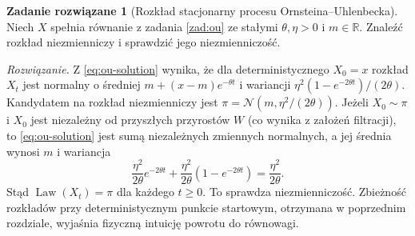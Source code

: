 \documentclass[11pt,a4paper,oneside]{report}
\numberwithin{equation}{chapter}
\theoremstyle{plain}
\theoremstyle{definition}
\newtheorem{zadanie}{Zadanie rozwiązane}[chapter]
\theoremstyle{remark}
\newcommand{\R}{\mathbb{R}}
\newcommand{\Law}{\operatorname{Law}}
\newcommand{\Normal}{\mathcal{N}}
\begin{document}
\begin{zadanie}[Rozkład stacjonarny procesu Ornsteina--Uhlenbecka]
Niech $X$ spełnia równanie z zadania \ref{zad:ou}
ze stałymi $\theta,\eta>0$ i $m\in\R$.
Znaleźć rozkład niezmienniczy i sprawdzić jego
niezmienniczość.

\emph{Rozwiązanie.} Z \eqref{eq:ou-solution}
wynika, że dla deterministycznego $X_0=x$ rozkład
$X_t$ jest normalny o średniej
$m+(x-m)e^{-\theta t}$ i wariancji
$\eta^2(1-e^{-2\theta t})/(2\theta)$.
Kandydatem na rozkład niezmienniczy jest
$\pi=\Normal(m,\eta^2/(2\theta))$.
Jeżeli $X_0\sim\pi$ i $X_0$ jest niezależny od
przyszłych przyrostów $W$ (co wynika z założeń
filtracji), to \eqref{eq:ou-solution} jest sumą
niezależnych zmiennych normalnych, a jej średnia
wynosi $m$ i wariancja
\[
\frac{\eta^2}{2\theta}e^{-2\theta t}
+\frac{\eta^2}{2\theta}(1-e^{-2\theta t})
=\frac{\eta^2}{2\theta}.
\]
Stąd $\Law(X_t)=\pi$ dla każdego $t\ge0$.
To sprawdza niezmienniczość. Zbieżność rozkładów
przy deterministycznym punkcie startowym, otrzymana
w poprzednim rozdziale, wyjaśnia fizyczną intuicję
powrotu do równowagi.
\end{zadanie}
\end{document}
